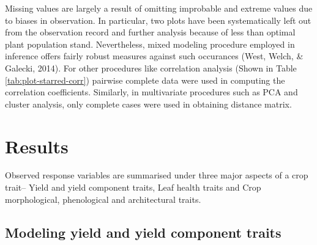\documentclass[12pt,oneside]{dukestatscithesis} %
\begin{document}
Missing values are largely a result of omitting improbable and extreme values due to biases in observation. In particular, two plots have been systematically left out from the observation record and further analysis because of less than optimal plant population stand. Nevertheless, mixed modeling procedure employed in inference offers fairly robust measures against such occurances (West, Welch, \& Galecki, 2014). For other procedures like correlation analysis (Shown in Table \ref{tab:plot-starred-corr}) pairwise complete data were used in computing the correlation coefficients. Similarly, in multivariate procedures such as PCA and cluster analysis, only complete cases were used in obtaining distance matrix.

\hypertarget{results}{%
\chapter{Results}\label{results}}

Observed response variables are summarised under three major aspects of a crop trait-- Yield and yield component traits, Leaf health traits and Crop morphological, phenological and architectural traits.

\hypertarget{modeling-yield-and-yield-component-traits}{%
\section{Modeling yield and yield component traits}\label{modeling-yield-and-yield-component-traits}}
\end{document}

